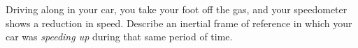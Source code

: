 Driving along in your car, you take your foot off the
gas, and your speedometer shows a reduction in speed.
Describe an inertial frame of reference in which your car was
\emph{speeding up} during that same period of time.
